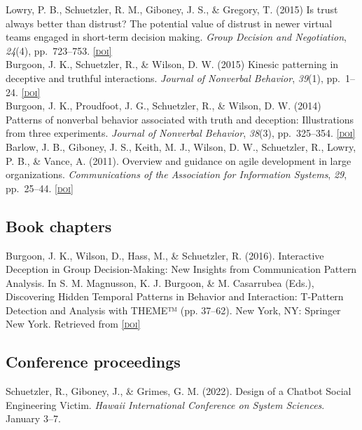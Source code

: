 \documentclass[10pt, letter]{article}
\newcommand{\doi}[1]{\href{#1}{\scriptsize\textsc{[doi]}}}
\newcommand{\years}[1]{\marginnote{\scriptsize #1}}
\begin{document}
\years{}Lowry, P. B., Schuetzler, R. M., Giboney, J. S., \& Gregory, T. (2015) Is
trust always better than distrust? The potential value of distrust in newer virtual teams
engaged in short-term decision making. \emph{Group Decision and
	Negotiation}, \emph{24}(4), pp.\ 723--753. \doi{http://dx.doi.org/10.1007/s10726-014-9410-x}\\

\years{}Burgoon, J. K., Schuetzler, R., \& Wilson, D. W. (2015) Kinesic patterning in
deceptive and truthful interactions.  \emph{Journal of Nonverbal Behavior}, \emph{39}(1), pp.\ 1--24. \doi{http://dx.doi.org/10.1007/s10919-014-0190-4}\\


\years{2014}Burgoon, J. K., Proudfoot, J. G., Schuetzler, R., \& Wilson, D. W. (2014)
Patterns of nonverbal behavior associated with truth and deception: Illustrations from
three experiments. \emph{Journal of Nonverbal
	Behavior}, \emph{38}(3), pp.\ 325--354. \doi{http://dx.doi.org/10.1007/s10919-014-0181-5}\\

\years{2011}Barlow, J. B., Giboney, J. S., Keith, M. J., Wilson, D. W., Schuetzler, R.,
Lowry, P. B., \& Vance, A. (2011). Overview and guidance on agile development in large
organizations. \emph{Communications of the Association for Information Systems}, \emph{29},
pp.\ 25--44. \doi{https://doi.org/10.17705/1CAIS.02902}

\newpage

\subsection*{Book chapters}
\noindent

\years{2016}Burgoon, J. K., Wilson, D., Hass, M., \& Schuetzler, R. (2016). Interactive Deception in Group Decision-Making: New Insights from Communication Pattern Analysis. In S. M. Magnusson, K. J. Burgoon, \& M. Casarrubea (Eds.), Discovering Hidden Temporal Patterns in Behavior and Interaction: T-Pattern Detection and Analysis with THEME™ (pp. 37–62). New York, NY: Springer New York. Retrieved from \doi{http://dx.doi.org/10.1007/978-1-4939-3249-8_2}

\subsection*{Conference proceedings}
\noindent
\years{2022}Schuetzler, R., Giboney, J., \& Grimes, G. M. (2022). Design of a Chatbot Social Engineering Victim. \emph{Hawaii International Conference on System Sciences}. January 3--7.\\
\end{document}
